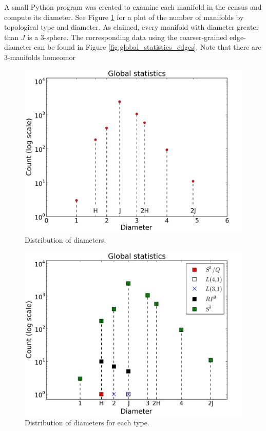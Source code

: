 \documentclass[12pt]{article}
\begin{document}
A small Python program was created to examine each manifold in the census and compute its diameter. See Figure \ref{fig:global_statistics} for a plot of the number of manifolds by topological type and diameter. As claimed, every manifold with diameter greater than $J$ is a 3-sphere. The corresponding data using the coarser-grained edge-diameter can be found in Figure \ref{fig:global_statistics_edges}. Note that there are $3$-manifolds homeomor

\begin{figure}
    \begin{center}
    \includegraphics[width=0.6\linewidth]{figures/global_statistics.png}
    \end{center}
    \caption{Distribution of diameters.}
    \label{fig:global_statistics}
\end{figure}

\begin{figure}
    \begin{center}
    \includegraphics[width=0.6\linewidth]{figures/split_statistics.png}
    \end{center}
    \caption{Distribution of diameters for each type.}
    \label{fig:type_statistics}
\end{figure}
\end{document}
